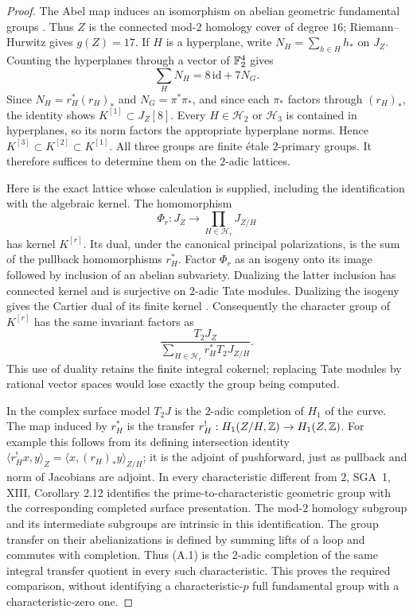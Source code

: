 \begin{proof}
The Abel map induces an isomorphism on abelian geometric
fundamental groups \citep[III, Proposition 9.1]{A_Milne2008}.
Thus $Z$ is the connected mod-$2$ homology cover of degree $16$;
Riemann--Hurwitz gives $g(Z)=17$. If $H$ is a hyperplane, write
$N_H=\sum_{h\in H}h_*$ on $J_Z$. Counting the hyperplanes
through a vector of $\mathbb F_2^4$ gives
\[
 \sum_H N_H=8\,\mathrm{id}+7N_G.
\]
Since $N_H=r_H^*(r_H)_*$ and $N_G=\pi^*\pi_*$, and since each
$\pi_*$ factors through $(r_H)_*$, the identity shows
$K^{[1]}\subset J_Z[8]$. Every $H\in\mathcal H_2$ or
$\mathcal H_3$ is contained in hyperplanes, so its norm factors
the appropriate hyperplane norms. Hence
$K^{[3]}\subset K^{[2]}\subset K^{[1]}$. All three groups are
finite \'etale $2$-primary groups. It therefore suffices to determine
them on the $2$-adic lattices.

Here is the exact lattice whose calculation is supplied, including
the identification with the algebraic kernel. The homomorphism
\[
 \Phi_r:J_Z\longrightarrow\prod_{H\in\mathcal H_r}J_{Z/H}
\]
has kernel $K^{[r]}$. Its dual, under the canonical principal
polarizations, is the sum of the pullback homomorphisms $r_H^*$.
Factor $\Phi_r$ as an isogeny onto its image followed by inclusion
of an abelian subvariety. Dualizing the latter inclusion has connected
kernel and is surjective on $2$-adic Tate modules. Dualizing the
isogeny gives the Cartier dual of its finite kernel
\citep[I, Theorem 9.1]{A_Milne2008}. Consequently the character
group of $K^{[r]}$ has the same invariant factors as
\[
 \frac{T_2J_Z}{\sum_{H\in\mathcal H_r}r_H^*T_2J_{Z/H}}.       \tag{A.1}
\]
This use of duality retains the finite integral cokernel; replacing
Tate modules by rational vector spaces would lose exactly the group
being computed.

In the complex surface model $T_2J$ is the $2$-adic completion of
$H_1$ of the curve. The map induced by $r_H^*$ is the transfer
$r_H^!:H_1(Z/H,\mathbb Z)\to H_1(Z,\mathbb Z)$. For example this follows
from its defining intersection identity
$\langle r_H^!x,y\rangle_Z=\langle x,(r_H)_*y\rangle_{Z/H}$;
it is the adjoint of pushforward, just as pullback and norm of
Jacobians are adjoint. In every characteristic different from $2$,
SGA~1, XIII, Corollary 2.12 identifies the prime-to-characteristic
geometric group with the corresponding completed surface
presentation. The mod-$2$ homology subgroup and its intermediate
subgroups are intrinsic in this identification. The group transfer
on their abelianizations is defined by summing lifts of a loop and
commutes with completion. Thus (A.1) is the $2$-adic completion of
the same integral transfer quotient in every such characteristic.
This proves the required comparison, without identifying a
characteristic-$p$ full fundamental group with a characteristic-zero
one.


\end{proof}
